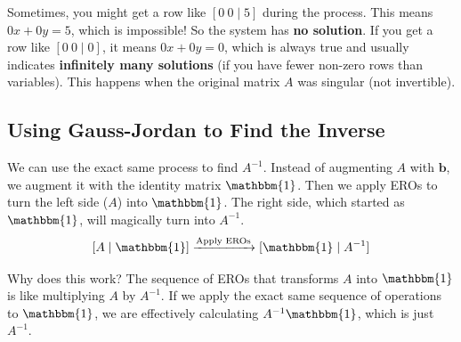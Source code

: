 \documentclass[11pt]{article}
\newcommand{\bb}{\mathbf{b}}
\newcommand{\id}{\mathbbm{1}}
\begin{document}
\begin{remark}
Sometimes, you might get a row like $[0 \ 0 \mid 5]$ during the process. This means $0x + 0y = 5$, which is impossible! So the system has \textbf{no solution}. If you get a row like $[0 \ 0 \mid 0]$, it means $0x+0y=0$, which is always true and usually indicates \textbf{infinitely many solutions} (if you have fewer non-zero rows than variables). This happens when the original matrix $A$ was singular (not invertible).
\end{remark}

\subsection{Using Gauss-Jordan to Find the Inverse}

We can use the exact same process to find $A^{-1}$. Instead of augmenting $A$ with $\bb$, we augment it with the identity matrix $\id$. Then we apply EROs to turn the left side ($A$) into $\id$. The right side, which started as $\id$, will magically turn into $A^{-1}$.
\[ [A \mid \id] \xrightarrow{\text{Apply EROs}} [\id \mid A^{-1}] \]

Why does this work? The sequence of EROs that transforms $A$ into $\id$ is like multiplying $A$ by $A^{-1}$. If we apply the exact same sequence of operations to $\id$, we are effectively calculating $A^{-1} \id$, which is just $A^{-1}$.
\end{document}
